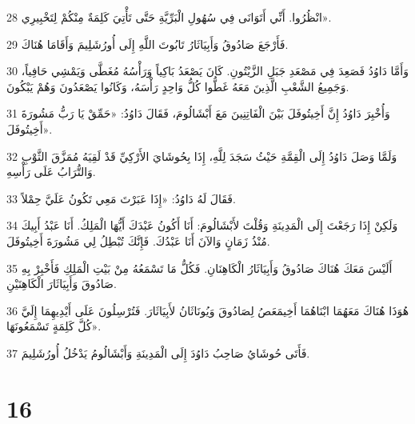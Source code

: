 \par 28 انْظُرُوا. أَنِّي أَتَوَانَى فِي سُهُولِ الْبَرِّيَّةِ حَتَّى تَأْتِيَ كَلِمَةٌ مِنْكُمْ لِتَخْبِيرِي».
\par 29 فَأَرْجَعَ صَادُوقُ وَأَبِيَاثَارُ تَابُوتَ اللَّهِ إِلَى أُورُشَلِيمَ وَأَقَامَا هُنَاكَ.
\par 30 وَأَمَّا دَاوُدُ فَصَعِدَ فِي مَصْعَدِ جَبَلِ الزَّيْتُونِ. كَانَ يَصْعَدُ بَاكِياً وَرَأْسُهُ مُغَطَّى وَيَمْشِي حَافِياً، وَجَمِيعُ الشَّعْبِ الَّذِينَ مَعَهُ غَطُّوا كُلُّ وَاحِدٍ رَأْسَهُ، وَكَانُوا يَصْعَدُونَ وَهُمْ يَبْكُونَ.
\par 31 وَأُخْبِرَ دَاوُدُ إِنَّ أَخِيتُوفَلَ بَيْنَ الْفَاتِنِينَ مَعَ أَبْشَالُومَ، فَقَالَ دَاوُدُ: «حَمِّقْ يَا رَبُّ مَشُورَةَ أَخِيتُوفَلَ».
\par 32 وَلَمَّا وَصَلَ دَاوُدُ إِلَى الْقِمَّةِ حَيْثُ سَجَدَ لِلَّهِ، إِذَا بِحُوشَايَ الأَرْكِيِّ قَدْ لَقِيَهُ مُمَزَّقَ الثَّوْبِ وَالتُّرَابُ عَلَى رَأْسِهِ.
\par 33 فَقَالَ لَهُ دَاوُدُ: «إِذَا عَبَرْتَ مَعِي تَكُونُ عَلَيَّ حِمْلاً.
\par 34 وَلَكِنْ إِذَا رَجَعْتَ إِلَى الْمَدِينَةِ وَقُلْتَ لأَبْشَالُومَ: أَنَا أَكُونُ عَبْدَكَ أَيُّهَا الْمَلِكُ. أَنَا عَبْدُ أَبِيكَ مُنْذُ زَمَانٍ وَالآنَ أَنَا عَبْدُكَ. فَإِنَّكَ تُبْطِلُ لِي مَشُورَةَ أَخِيتُوفَلَ.
\par 35 أَلَيْسَ مَعَكَ هُنَاكَ صَادُوقُ وَأَبِيَاثَارُ الْكَاهِنَانِ. فَكُلُّ مَا تَسْمَعُهُ مِنْ بَيْتِ الْمَلِكِ فَأَخْبِرْ بِهِ صَادُوقَ وَأَبِيَاثَارَ الْكَاهِنَيْنِ.
\par 36 هُوَذَا هُنَاكَ مَعَهُمَا ابْنَاهُمَا أَخِيمَعَصُ لِصَادُوقَ وَيُونَاثَانُ لأَبِيَاثَارَ. فَتُرْسِلُونَ عَلَى أَيْدِيهِمَا إِلَيَّ كُلَّ كَلِمَةٍ تَسْمَعُونَهَا».
\par 37 فَأَتَى حُوشَايُ صَاحِبُ دَاوُدَ إِلَى الْمَدِينَةِ وَأَبْشَالُومُ يَدْخُلُ أُورُشَلِيمَ.

\chapter{16}

